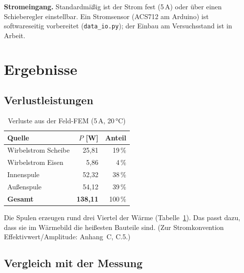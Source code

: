\documentclass[a4paper, 10pt, conference]{ieeeconf}
\begin{document}
\textbf{Stromeingang.} Standardmäßig ist der Strom fest (5\,A) oder über
einen Schieberegler einstellbar. Ein Stromsensor (ACS712 am Arduino) ist
softwareseitig vorbereitet (\texttt{data\_io.py}); der Einbau am
Versuchsstand ist in Arbeit.

\section{Ergebnisse}
\label{sec:results}

\subsection{Verlustleistungen}

\begin{table}[t]
\caption{Verluste aus der Feld-FEM (5\,A, 20\,°C)}
\label{tab:losses}
\centering\footnotesize
\begin{tabular}{@{}lrr@{}}
\toprule
Quelle & $P$ [W] & Anteil \\
\midrule
Wirbelstrom Scheibe & 25,81 & 19\,\% \\
Wirbelstrom Eisen & 5,86 & 4\,\% \\
Innenspule & 52,32 & 38\,\% \\
Außenspule & 54,12 & 39\,\% \\
\midrule
\textbf{Gesamt} & \textbf{138,11} & 100\,\% \\
\bottomrule
\end{tabular}
\end{table}

Die Spulen erzeugen rund drei Viertel der Wärme
(Tabelle~\ref{tab:losses}). Das passt dazu, dass sie im Wärmebild die
heißesten Bauteile sind. (Zur Stromkonvention Effektivwert/Amplitude:
Anhang~C, C.5.)

\subsection{Vergleich mit der Messung}
\end{document}

